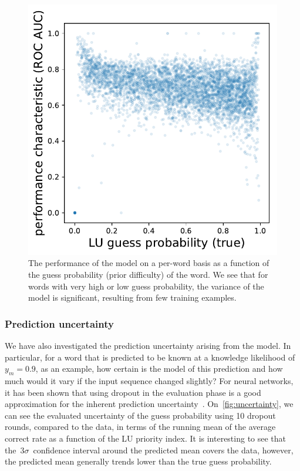 \begin{figure}[ht]
\centering
\includegraphics[width=0.5\linewidth]{figures/lingvist/lu_roc_guess_proba.pdf}
\caption[Model performance on a per-LU basis as a function of average LU guess probability.]{The performance of the model on a per-word basis as a function of the guess probability (prior difficulty) of the word. We see that for words with very high or low guess probability, the variance of the model is significant, resulting from few training examples.}
\label{fig:lu_roc_guess_proba}
\end{figure}

\subsubsection{Prediction uncertainty}
We have also investigated the prediction uncertainty arising from the model. In particular, for a word that is predicted to be known at a knowledge likelihood of~$y_m=0.9$, as an example, how certain is the model of this prediction and how much would it vary if the input sequence changed slightly? For neural networks, it has been shown that using dropout in the evaluation phase is a good approximation for the inherent prediction uncertainty~\cite{gal2016dropout}. On~\cref{fig:uncertainty}, we can see the evaluated uncertainty of the guess probability using 10 dropout rounds, compared to the data, in terms of the running mean of the average correct rate as a function of the LU priority index. It is interesting to see that the~$3\sigma$~confidence interval around the predicted mean covers the data, however, the predicted mean generally trends lower than the true guess probability.

